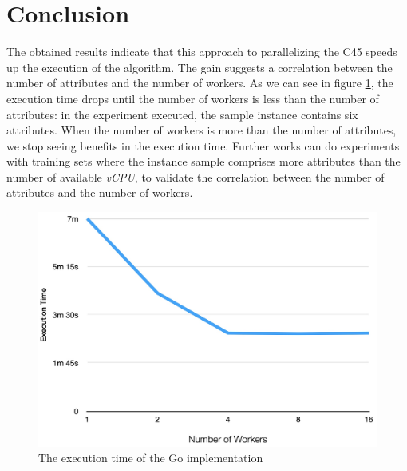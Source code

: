 \documentclass[conference]{IEEEtran}
\begin{document}
\section{Conclusion}

The obtained results indicate that this approach to parallelizing the C45 speeds up the execution of the algorithm. The gain suggests a correlation between the number of attributes and the number of workers. As we can see in figure \ref{fig:py-execution-time}, the execution time drops until the number of workers is less than the number of attributes: in the experiment executed, the sample instance contains six attributes. When the number of workers is more than the number of attributes, we stop seeing benefits in the execution time. Further works can do experiments with training sets where the instance sample comprises more attributes than the number of available \textit{vCPU}, to validate the correlation between the number of attributes and the number of workers.

\begin{figure}[h]
    \centering
    \includegraphics[width=0.8\linewidth]{images/go-execution-time.jpg}
    \caption{The execution time of the Go implementation}
    \label{fig:py-execution-time}
\end{figure}
\end{document}
